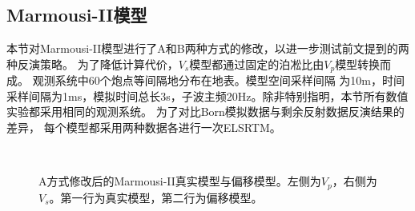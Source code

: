 \subsection{Marmousi-II模型}
本节对Marmousi-II模型进行了A和B两种方式的修改，以进一步测试前文提到的两种反演策略。
为了降低计算代价，$V_s$模型都通过固定的泊凇比由$V_p$模型转换而成。
观测系统中60个炮点等间隔地分布在地表。模型空间采样间隔
为10m，时间采样间隔为1ms，模拟时间总长3s，子波主频20Hz。除非特别指明，本节所有数值实验都采用相同的观测系统。
为了对比Born模拟数据与剩余反射数据反演结果的差异，
每个模型都采用两种数据各进行一次ELSRTM。
\begin{figure}[!htb]
   \centering
   \\
   \caption{A方式修改后的Marmousi-II真实模型与偏移模型。左侧为$V_p$，右侧为$V_s$。第一行为真实模型，第二行为偏移模型。}
   \label{fig:TrueAndInitial_1}
\end{figure}
